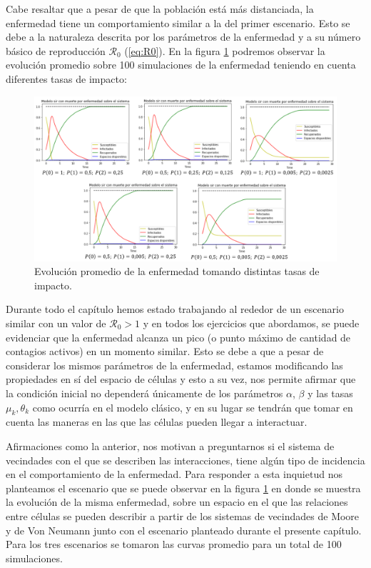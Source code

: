 Cabe resaltar que a pesar de que la población está más distanciada, la enfermedad tiene un comportamiento similar a la del primer escenario. Esto se debe a la naturaleza descrita por los parámetros de la enfermedad y a su número básico de reproducción $\mathcal{R}_0$ (\ref{eq:R0}). En la figura \ref{fig:comparacionTasasdeImpacto} podremos observar la evolución promedio sobre 100 simulaciones de la enfermedad teniendo en cuenta diferentes tasas de impacto:

\begin{figure}[h]
  \centering
    \includegraphics[width=1.05\textwidth]{Imagenes/comparacionTasasImpacto.PNG}
    \caption{Evolución promedio de la enfermedad tomando distintas tasas de impacto.}
    \label{fig:comparacionTasasdeImpacto}
\end{figure}

Durante todo el capítulo hemos estado trabajando al rededor de un escenario similar con un valor de $\mathcal{R}_0>1$ y en todos los ejercicios que abordamos, se puede evidenciar que la enfermedad alcanza un pico (o punto máximo de cantidad de contagios activos) en un momento similar. Esto se debe a que a pesar de considerar los mismos parámetros de la enfermedad, estamos modificando las propiedades en sí del espacio de células y esto a su vez, nos permite afirmar que la condición inicial no dependerá únicamente de los parámetros $\alpha$, $\beta$ y las tasas $\mu_k, \theta_k$ como ocurría en el modelo clásico, y en su lugar se tendrán que tomar en cuenta las maneras en las que las células pueden llegar a interactuar.

Afirmaciones como la anterior, nos motivan a preguntarnos si el sistema de vecindades con el que se describen las interacciones, tiene algún tipo de incidencia en el comportamiento de la enfermedad. Para responder a esta inquietud nos planteamos el escenario que se puede observar en la figura \ref{fig:comparacionTasasdeImpacto} en donde se muestra la evolución de la misma enfermedad, sobre un espacio en el que las relaciones entre células se pueden describir a partir de los sistemas de vecindades de Moore y de Von Neumann junto con el escenario planteado durante el presente capítulo. Para los tres escenarios se tomaron las curvas promedio para un total de 100 simulaciones.

